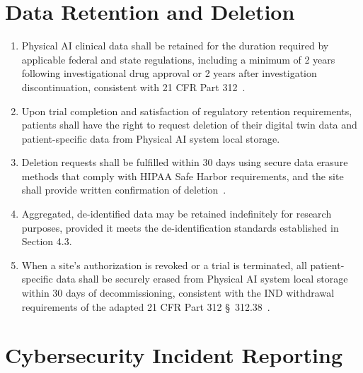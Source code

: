 \documentclass[11pt,letterpaper]{article}
\begin{document}
\section{Data Retention and Deletion}

\begin{enumerate}[label=(\alph*)]
\item Physical AI clinical data shall be retained for the duration required by
  applicable federal and state regulations, including a minimum of 2 years
  following investigational drug approval or 2 years after investigation
  discontinuation, consistent with 21 CFR Part 312~\cite{cfr312adapt}.

\item Upon trial completion and satisfaction of regulatory retention
  requirements, patients shall have the right to request deletion of their
  digital twin data and patient-specific data from Physical AI system local
  storage.

\item Deletion requests shall be fulfilled within 30 days using secure data
  erasure methods that comply with HIPAA Safe Harbor requirements, and the
  site shall provide written confirmation of deletion~\cite{cfr312adapt}.

\item Aggregated, de-identified data may be retained indefinitely for research
  purposes, provided it meets the de-identification standards established in
  Section 4.3.

\item When a site's authorization is revoked or a trial is terminated, all
  patient-specific data shall be securely erased from Physical AI system local
  storage within 30 days of decommissioning, consistent with the IND
  withdrawal requirements of the adapted 21 CFR Part 312
  \S~312.38~\cite{cfr312adapt}.
\end{enumerate}

\section{Cybersecurity Incident Reporting}
\end{document}
